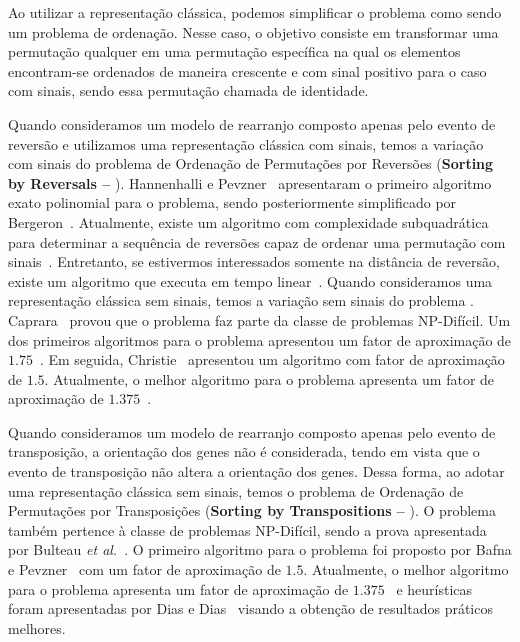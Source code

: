 Ao utilizar a representação clássica, podemos simplificar o problema como sendo um problema de ordenação. Nesse caso, o objetivo consiste em transformar uma permutação qualquer em uma permutação específica na qual os elementos encontram-se ordenados de maneira crescente e com sinal positivo para o caso com sinais, sendo essa permutação chamada de identidade.

Quando consideramos um modelo de rearranjo composto apenas pelo evento de reversão e utilizamos uma representação clássica com sinais, temos a variação com sinais do problema de Ordenação de Permutações por Reversões (\textbf{Sorting by Reversals --} \SbR). Hannenhalli e Pevzner~\cite{1999-hannenhalli-pevzner} apresentaram o primeiro algoritmo exato polinomial para o problema, sendo posteriormente simplificado por Bergeron~\cite{2005-bergeron}. Atualmente, existe um algoritmo com complexidade subquadrática para determinar a sequência de reversões capaz de ordenar uma permutação com sinais~\cite{2007-tannier-etal}. Entretanto, se estivermos interessados somente na distância de reversão, existe um algoritmo que executa em tempo linear~\cite{2001-bader-etal}. Quando consideramos uma representação clássica sem sinais, temos a variação sem sinais do problema \SbR. Caprara~\cite{1999a-caprara} provou que o problema faz parte da classe de problemas NP-Difícil. Um dos primeiros algoritmos para o problema apresentou um fator de aproximação de $1.75$~\cite{1996-bafna-pevzner}. Em seguida, Christie~\cite{1998a-christie} apresentou um algoritmo com fator de aproximação de $1.5$. Atualmente, o melhor algoritmo para o problema apresenta um fator de aproximação de $1.375$~\cite{2002-berman-etal}.

Quando consideramos um modelo de rearranjo composto apenas pelo evento de transposição, a orientação dos genes não é considerada, tendo em vista que o evento de transposição não altera a orientação dos genes. Dessa forma, ao adotar uma representação clássica sem sinais, temos o problema de Ordenação de Permutações por Transposições (\textbf{Sorting by Transpositions --} \SbT). O problema também pertence à classe de problemas NP-Difícil, sendo a prova apresentada por Bulteau \textit{et al.}~\cite{2012-bulteau-etal}. O primeiro algoritmo para o problema foi proposto por Bafna e Pevzner~\cite{1998-bafna-pevzner} com um fator de aproximação de $1.5$. Atualmente, o melhor algoritmo para o problema apresenta um fator de aproximação de $1.375$~\cite{2006-elias-hartman,2022-silva-etal} e heurísticas foram apresentadas por Dias e Dias~\cite{2010c-dias-dias} visando a obtenção de resultados práticos melhores. 

